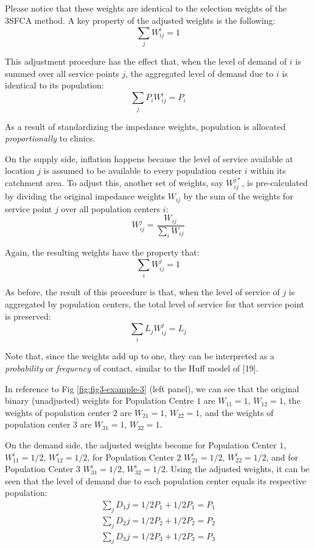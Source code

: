 \documentclass[10pt,letterpaper]{article}
\begin{document}
Please notice that these weights are identical to the selection weights
of the 3SFCA method. A key property of the adjusted weights is the
following: \[
\sum_jW_{ij}^{i}=1
\]

This adjustment procedure has the effect that, when the level of demand
of \(i\) is summed over all service points \(j\), the aggregated level
of demand due to \(i\) is identical to its population: \[
\sum_j P_iW_{ij}^{i} = P_i
\]

As a result of standardizing the impedance weights, population is
allocated \emph{proportionally} to clinics.

On the supply side, inflation happens because the level of service
available at location \(j\) is assumed to be available to every
population center \(i\) within its catchment area. To adjust this,
another set of weights, say \(W^{j*}_{ij}\), is pre-calculated by
dividing the original impedance weights \(W_{ij}\) by the sum of the
weights for service point \(j\) over all population centers \(i\): \[
W_{ij}^{j} = \frac{W_{ij}}{\sum_i W_{ij}}
\]

Again, the resulting weights have the property that: \[
\sum_iW_{ij}^{j}=1
\]

As before, the result of this procedure is that, when the level of
service of \(j\) is aggregated by population centers, the total level of
service for that service point is preserved: \[
\sum_i L_jW_{ij}^{j} = L_j 
\]

Note that, since the weights add up to one, they can be interpreted as a
\emph{probability} or \emph{frequency} of contact, similar to the Huff
model of {[}19{]}.

In reference to Fig \ref{fig:fig3-example-3} (left panel), we can see
that the original binary (unadjusted) weights for Population Centre
\(1\) are \(W_{11} = 1\), \(W_{12} = 1\), the weights of population
center \(2\) are \(W_{21} = 1\), \(W_{22} = 1\), and the weights of
population center \(3\) are \(W_{31} = 1\), \(W_{32} = 1\).

On the demand side, the adjusted weights become for Population Center
\(1\), \(W^{i}_{11} = 1/2\), \(W^{i}_{12} = 1/2\), for Population Center
\(2\) \(W^{i}_{21} = 1/2\), \(W^{i}_{22} = 1/2\), and for Population
Center \(3\) \(W^{i}_{31} = 1/2\), \(W^{i}_{32} = 1/2\). Using the
adjusted weights, it can be seen that the level of demand due to each
population center equals its respective population: \[
\begin{array}{ll}
            \sum_j D_1j = 1/2P_1 + 1/2P_1 = P_1\\
            \sum_j D_2j = 1/2P_2 + 1/2P_2 = P_2\\
            \sum_j D_3j = 1/2P_3 + 1/2P_3 = P_3
        \end{array}
\]
\end{document}
